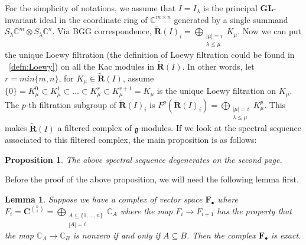 \documentclass[12pt]{amsart}
\newtheorem{prop}[thm]{Proposition}
\newtheorem{lem}[thm]{Lemma}
\theoremstyle{definition}
\theoremstyle{remark}
\newtheorem{rmk}[thm]{Remark}
\newcommand{\bC}{\mathbf{C}}
\newcommand{\bbC}{\mathbb{C}}
\newcommand{\bF}{\mathbf{F}}
\newcommand{\bR}{\mathbf{R}}
\newcommand{\fg}{\mathfrak{g}}
\newcommand{\dsum}{\bigoplus}
\newcommand{\GL}{\mathbf{GL}}
\numberwithin{equation}{section}
\begin{document}
For the simplicity of notations, we assume that $I = I_{\lambda}$ is the principal $\GL$-invariant ideal in the coordinate ring of $\bbC^{m \times n}$ generated by a single summand $S_{\lambda} \bbC^m \otimes S_{\lambda} \bbC^n$. Via BGG correspondence, $\tilde{\bR}(I)_i = \dsum_{\substack{|\mu| = i \\ \lambda \leq \mu}} K_{\mu}$.  Now we can put the unique Loewy filtration \cite{BS} (the definition of Loewy filtration could be found in  ~\ref{defn:Loewy}) on all the Kac modules in $\tilde{\bR}(I)$. In other words, let $r = min\{m,n\}$, for $K_{\mu} \in \tilde{\bR}(I)$, assume $\{0\} = K_{\mu}^0 \subset K_{\mu}^1 \subset \ldots \subset K_{\mu}^r \subset K_{\mu}^{r+1} = K_{\mu} $ is the unique Loewy filtration on $K_{\mu}$. The $p$-th filtration subgroup of $\tilde{\bR}(I)_i$  is $F^p(\tilde{\bR}(I)_i) = \dsum_{\substack{|\mu| = i \\ \lambda \leq \mu}} K_{\mu}^p$. This makes $\tilde{\bR}(I)$ a filtered complex of $\fg$-modules. If we look at the spectral sequence associated to this filtered complex, the main proposition is as follows:

\begin{prop} \label{prop:degenerate}
The above spectral sequence degenerates on the second page.
\end{prop}

Before the proof of the above proposition, we will need the following lemma first.

\begin{lem} \label{lemma:exact}
Suppose we have a complex of vector space $\bF_{\bullet}$ where $F_i = \bC^{\binom{n}{i}} = \dsum_{\substack{A \subseteq \{ 1, \ldots, n \} \\ |A| = i}} \bbC_A $ where the map $F_i \to F_{i+1}$ has the property that the map $\bbC_A \to \bbC_B$ is nonzero if and only if $A \subseteq B$. Then the complex $\bF_{\bullet}$ is exact.
\end{lem}

\end{document}
